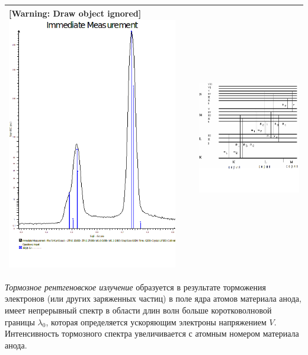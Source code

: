 \documentclass[a4paper,14pt, openany, twoside, draft]{extbook} %
\begin{document}
\begin{flushleft}
\tablefirsthead{}
\tablehead{}
\tabletail{}
\tablelasttail{}
\begin{supertabular}{|m{8.0130005cm}|m{8.485001cm}|}
\hline
{ [Warning: Draw object ignored] \includegraphics[width=7.44cm,height=11.128cm]{a12-img002.png} } &
{  \includegraphics[width=8.285cm,height=9.442cm]{a12-img003.png} }\\\hline
\end{supertabular}
\end{flushleft}
\emph{Тормозное рентгеновское излучение} образуется в результате торможения электронов (или других заряженных частиц) в поле ядра атомов материала анода, имеет непрерывный спектр в области длин волн больше коротковолновой границы  $\lambda_0$, которая определяется ускоряющим электроны напряжением $V$.  Интенсивность тормозного спектра увеличивается с атомным номером материала анода.
\end{document}
